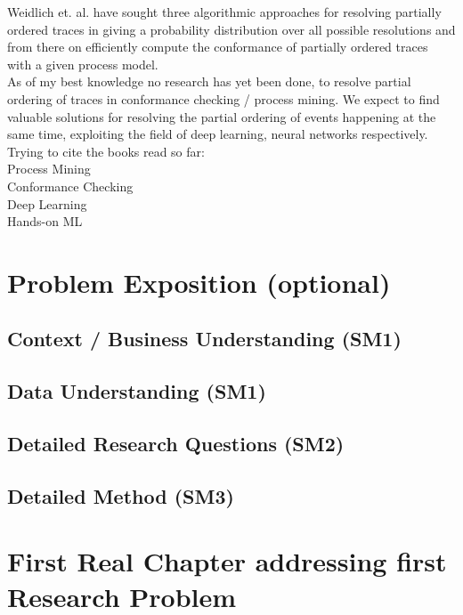 \documentclass[
	a4paper,
	pagesize,
	pdftex,
	12pt,
	ngerman,
	fleqn,
	final,
	]{scrartcl}
\theoremstyle{plain}
\theoremstyle{definition}
\begin{document}
	Weidlich et. al. have sought three algorithmic approaches for resolving partially ordered traces in giving a probability distribution over all possible resolutions and from there on efficiently compute the conformance of partially ordered traces with a given process model.\cite{self} \\
	As of my best knowledge no research has yet been done, to resolve partial ordering of traces in conformance checking / process mining. We expect to find valuable solutions for resolving the partial ordering of events happening at the same time, exploiting the field of deep learning, neural networks respectively. \\
	Trying to cite the books read so far: \\
	Process Mining \cite{AalstWilvander2016Pm:d} \\ 
	Conformance Checking \cite{carmona2018conformance} \\
	Deep Learning \cite{Goodfellow-et-al-2016}\\
	Hands-on ML \cite{geron2019hands}
	
	
\section{Problem Exposition (optional)}
	
	\subsection{Context / Business Understanding (SM1)}
	
	\subsection{Data Understanding (SM1)}
	
	\subsection{Detailed Research Questions (SM2)}
	
	\subsection{Detailed Method (SM3)}

\section{First Real Chapter addressing first Research Problem}
\end{document}

